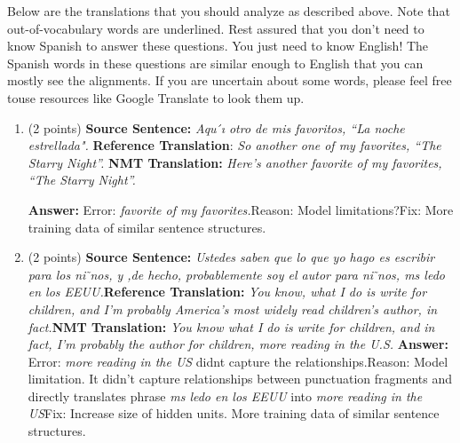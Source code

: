 \documentclass{article}
\begin{document}
    Below are the translations that you should analyze as described above.  Note that out-of-vocabulary words are underlined.  Rest assured that you don’t need to know Spanish to answer these questions. You just need to know English!  The Spanish words in these questions are similar enough to English that you can mostly see the alignments.  If you are uncertain about some words, please feel free touse resources like Google Translate to look them up.
    
    \begin{enumerate}[i]
        \item (2 points) \textbf{Source Sentence:} \textit{Aqu ́ı otro de mis favoritos, “La noche estrellada".} \newline  \textbf{Reference Translation}: \textit{So another one of my favorites, “The Starry Night”.} \newline \textbf{NMT Translation:} \textit{Here’s another favorite of my favorites, “The Starry Night”.}
        
        \smallbreak
        \textbf{Answer:} \newline Error: \textit{favorite of my favorites.}\newline Reason: Model limitations?\newline Fix: More training data of similar sentence structures.
        
        \item (2 points) \textbf{Source Sentence:} \textit{Ustedes saben que lo que yo hago es escribir para los ni ̃nos,  y ,de hecho, probablemente soy el autor para ni ̃nos, ms ledo en los EEUU.}\newline \textbf{Reference Translation:}\textit{ You know, what I do is write for children, and I’m probably America’s most widely read children’s author, in fact.}\newline \textbf{NMT Translation:} \textit{You know what I do is write for children, and in fact, I’m probably the author for children, more reading in the U.S.}
        \smallbreak
        \textbf{Answer:} \newline Error: \textit{more reading in the US} didnt capture the relationships.\newline Reason: Model limitation. It didn't capture relationships between punctuation fragments and directly translates phrase \textit{ms ledo en los EEUU} into \textit{more reading in the US}\newline Fix: Increase size of hidden units. More training data of similar sentence structures.
        

\end{enumerate}
\end{document}

